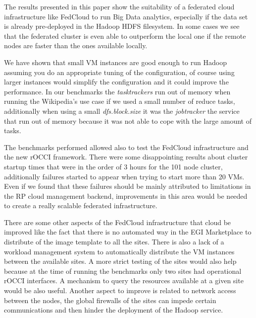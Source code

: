 The results presented in this paper show the suitability of a federated cloud infrastructure like FedCloud to run Big Data analytics, especially if the data set is already pre-deployed in the Hadoop HDFS filesystem. In some cases we see that the federated cluster is even able to outperform the local one if the remote nodes are faster than the ones available locally.

We have shown that small VM instances are good enough to run Hadoop assuming you do an appropriate tuning of the configuration, of course using larger instances would simplify the configuration and it could improve the performance. In our benchmarks the \emph{tasktrackers} run out of memory when running the Wikipedia's use case if we used a small number of reduce tasks, additionally when using a small \emph{dfs.block.size} it was the \emph{jobtracker} the service that run out of memory because it was not able to cope with the large amount of tasks.

The benchmarks performed allowed also to test the FedCloud infrastructure and the new rOCCI framework. There were some disappointing results about cluster startup times that were in the order of 3 hours for the 101 node cluster, additionally failures started to appear when trying to start more than 20 VMs. Even if we found that these failures should be mainly attributed to limitations in the RP cloud management backend, improvements in this area would be needed to create a really scalable federated infrastructure.

There are some other aspects of the FedCloud infrastructure that cloud be improved like the fact that there is no automated way in the EGI Marketplace to distribute of the image template to all the sites.
There is also a lack of a workload management system to automatically distribute the VM instances between the available sites. A more strict testing of the sites would also help because at the time of running the benchmarks only two sites had operational rOCCI interfaces.
A mechanism to query the resources available at a given site would be also useful.
Another aspect to improve is related to network access between the nodes, the global firewalls of the sites can impede certain communications and then hinder the deployment of the Hadoop service.


